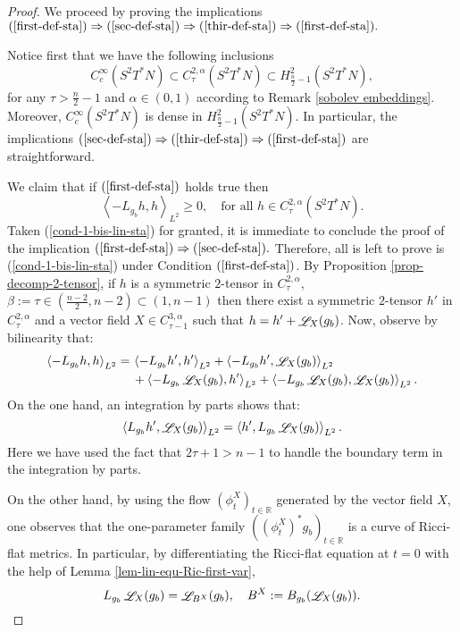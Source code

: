 \documentclass[a4paper,11pt,reqno]{amsart}
\def\RR{\mathbb{R}}
\def\Li{\mathop{\rm \mathscr{L}}\nolimits}
\def\Li{\mathop{\rm \mathscr{L}}\nolimits}
\numberwithin{equation}{section}
\begin{document}
	\begin{proof}
	We proceed by proving the implications $(\ref{first-def-sta})\Rightarrow (\ref{sec-def-sta})\Rightarrow (\ref{thir-def-sta})\Rightarrow (\ref{first-def-sta}).$
	
	Notice first that we have the following inclusions $$C^{\infty}_c(S^2T^*N)\subset C^{2,\alpha}_{\tau}(S^2T^*N)\subset H^2_{\frac{n}{2}-1}(S^2T^*N),$$ for any $\tau>\frac{n}{2}-1$ and $\alpha\in(0,1)$ according to Remark \ref{sobolev embeddings}. Moreover, $C_c^{\infty}(S^2T^*N)$ is dense in $H^2_{\frac{n}{2}-1}(S^2T^*N)$. In particular, the implications $(\ref{sec-def-sta})\Rightarrow (\ref{thir-def-sta})\Rightarrow (\ref{first-def-sta})$ are straightforward.
	
	We claim that if $(\ref{first-def-sta})$ holds true then 
	\begin{equation}
	\left<-L_{g_b}h,h\right>_{L^2}\geq 0,\quad\text{for all $h\in C^{2,\alpha}_{\tau}(S^2T^*N)$.}\label{cond-1-bis-lin-sta}
	\end{equation}
	  Taken (\ref{cond-1-bis-lin-sta}) for granted, it is immediate to conclude the proof of the implication $(\ref{first-def-sta})\Rightarrow (\ref{sec-def-sta}).$
	Therefore, all is left to prove is (\ref{cond-1-bis-lin-sta}) under Condition $(\ref{first-def-sta})$. By Proposition \ref{prop-decomp-2-tensor}, if $h$ is a symmetric $2$-tensor in $C^{2,\alpha}_{\tau}$, $\beta:=\tau\in\left(\frac{n-2}{2},n-2\right)\subset(1,n-1)$ then there exist a symmetric $2$-tensor $h'$ in $C^{2,\alpha}_{\tau}$ and a vector field $X\in C^{3,\alpha}_{\tau-1}$ such that $h=h'+\Li_X(g_b)$. Now, observe by bilinearity that:
	\begin{equation}
\begin{split}\label{easy-quad-form}
\left<-L_{g_b}h,h\right>_{L^2}=\,&\left<-L_{g_b}h',h'\right>_{L^2}+\left<-L_{g_b}h',\Li_X(g_b)\right>_{L^2}\\
&+\left<-L_{g_b}\Li_X(g_b),h'\right>_{L^2}+\left<-L_{g_b}\Li_X(g_b),\Li_X(g_b)\right>_{L^2}.
\end{split}
\end{equation}
On the one hand, an integration by parts shows that:
\begin{equation}\label{easy-IBP}
\left<L_{g_b}h',\Li_X(g_b)\right>_{L^2}=\left<h',L_{g_b}\Li_X(g_b)\right>_{L^2}.
\end{equation}
Here we have used the fact that $2\tau+1>n-1$ to handle the boundary term in the integration by parts.

On the other hand, by using the flow $(\phi^X_t)_{t\in \RR}$ generated by the vector field $X$, one observes that the one-parameter family $((\phi_t^X)^*g_b)_{t\in \RR}$ is a curve of Ricci-flat metrics. In particular, by differentiating the Ricci-flat equation at $t=0$ with the help of Lemma \ref{lem-lin-equ-Ric-first-var}, 
\begin{equation}\label{identif-im-lie-der}
L_{g_b}\Li_X(g_b)=\Li_{B^X}(g_b),\quad B^X:=B_{g_b}(\Li_X(g_b)).
\end{equation}


\end{proof}
\end{document}
